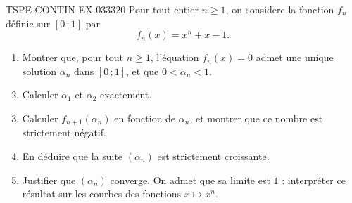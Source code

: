 \begin{exercice}{TSPE-CONTIN-EX-033}{3}{20}
Pour tout entier $n \geq 1$, on considere la fonction $f_n$ définie sur $[0\,;1]$ par
\[ f_n(x) = x^n + x - 1. \]
\begin{enumerate}
  \item Montrer que, pour tout $n \geq 1$, l'équation $f_n(x) = 0$ admet une unique solution $\alpha_n$ dans $[0\,;1]$, et que $0 < \alpha_n < 1$.
  \item Calculer $\alpha_1$ et $\alpha_2$ exactement.
  \item Calculer $f_{n+1}(\alpha_n)$ en fonction de $\alpha_n$, et montrer que ce nombre est strictement négatif.
  \item En déduire que la suite $(\alpha_n)$ est strictement croissante.
  \item Justifier que $(\alpha_n)$ converge. On admet que sa limite est $1$ : interpréter ce résultat sur les courbes des fonctions $x \mapsto x^n$.
\end{enumerate}
\end{exercice}
